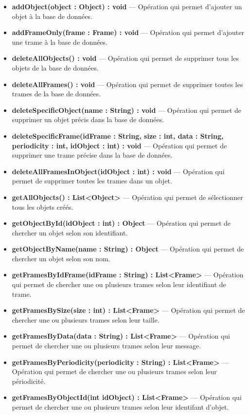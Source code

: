 \begin{itemize}
    \item \textbf{addObject(object : Object) : void } --- Opération qui permet d'ajouter un objet à la base de données.
    \item \textbf{addFrameOnly(frame : Frame) : void } --- Opération qui permet d'ajouter une trame à la base de données.
    \item \textbf{deleteAllObjects() : void } --- Opération qui permet de supprimer tous les objets de la base de données. 
    \item \textbf{deleteAllFrames() : void } --- Opération qui permet de supprimer toutes les trames de la base de données.
    \item \textbf{deleteSpecificObject(name : String) : void } --- Opération qui permet de supprimer un objet précis dans la base de données.
    \item \textbf{deleteSpecificFrame(idFrame : String, size : int, data : String, periodicity : int, idObject : int) : void } --- Opération qui permet de supprimer une trame précise dans la base de données. 
    \item \textbf{deleteAllFramesInObject(idObject : int) : void } --- Opération qui permet de supprimer toutes les trames dans un objet. 
    \item \textbf{getAllObjects() : List<Object> } --- Opération qui permet de sélectionner tous les objets créés. 
    \item \textbf{getObjectById(idObject : int) : Object } --- Opération qui permet de chercher un objet selon son identifiant. 
    \item \textbf{getObjectByName(name : String) : Object } --- Opération qui permet de chercher un objet selon son nom. 
    \item \textbf{getFramesByIdFrame(idFrame : String) : List<Frame> } --- Opération qui permet de chercher une ou plusieurs trames selon leur identifiant de trame.
    \item \textbf{getFramesBySize(size : int) : List<Frame> } --- Opération qui permet de chercher une ou plusieurs trames selon leur taille.
    \item \textbf{getFramesByData(data : String) : List<Frame> } --- Opération qui permet de chercher une ou plusieurs trames selon leur message.
    \item \textbf{getFramesByPeriodicity(periodicity : String) : List<Frame> } --- Opération qui permet de chercher une ou plusieurs trames selon leur périodicité.
    \item \textbf{getFramesByObjectId(int idObject) : List<Frame> } --- Opération qui permet de chercher une ou plusieurs trames selon leur identifant d'objet.

\end{itemize}
